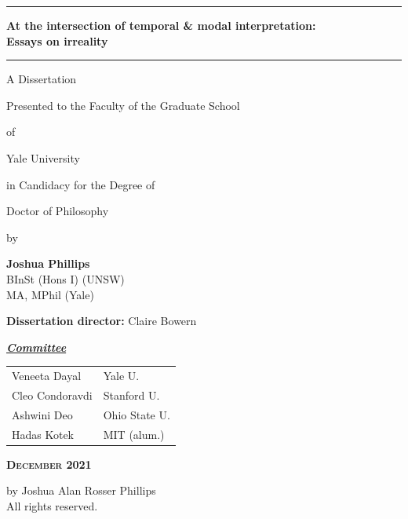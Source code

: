 \documentclass[11pt,dvipsnames]{report}
\date{}
\newcommand{\HRule}{\rule{\linewidth}{0.5mm}}
\begin{document}
	

	
\begin{center}
	\thispagestyle{empty}
	\vfill
	\HRule\vspace{.33cm}
	
	\setcounter{page}{-1}
	\textbf{{\Large At the intersection of temporal \& modal interpretation:}\\
		{\large Essays on irreality}}%
	
	\HRule\setmainfont{Linux Libertine Display O}
	\vfill
	\large	A Dissertation
	
	Presented to the Faculty of the Graduate School%
	
	of
	
	Yale University
	
	in Candidacy for the Degree of 
	
	Doctor of Philosophy
	\vfill
	{\small by
		
		{\normalsize\textbf{Joshua Phillips}}\\\scriptsize BInSt (Hons I\textasteriskcentered)  (UNSW)\\[-.625em]MA, MPhil (Yale)}
	\vfill
	
	\textbf{Dissertation director:} Claire Bowern
	\vfill
	{\normalsize\ul{\textit{\textbf{Committee}}}\\[.5em]
	\begin{tabular}{ll}
		Veneeta Dayal & Yale U.\\
		Cleo Condoravdi & Stanford U.\\
		Ashwini Deo & Ohio State U.\\
		Hadas Kotek & MIT  (alum.)\\
	\end{tabular}}
	
	
	
%	
	\vfill
\textbf{\textsc{December 2021}}
	
	
\end{center}
\pagebreak{}
\hspace{0pt}
\vspace*{3in}
\begin{center}
	 by Joshua Alan Rosser Phillips\\
	
	All rights reserved.
\end{center}
\vfill
\hspace{0pt}
\pagebreak
\end{document}
